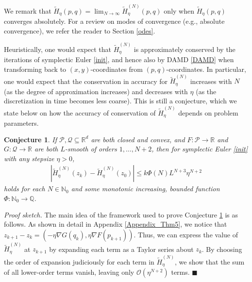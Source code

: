 \documentclass[11pt]{article}
\newtheorem{conjecture}{Conjecture}
\renewcommand{\P}{\mathcal{P}}
\newcommand{\R}{\mathbb{R}}
\newcommand{\N}{\mathbb{N}}
\newcommand{\Q}{\mathcal{Q}}
\begin{document}
We remark that $\widetilde{H}_{\eta}(p, q)=\lim_{N \to \infty} \widetilde{H}_{\eta}^{(N)}(p, q)$ only when $\widetilde{H}_{\eta}(p, q)$ converges absolutely. For a review on modes of convergence (e.g., absolute convergence), we refer the reader to Section \ref{odes}. 

Heuristically, one would expect that $\widetilde{H}_{\eta}^{(N)}$ is approximately conserved by the iterations of symplectic Euler \eqref{init}, and hence also by DAMD \eqref{DAMD} when transforming back to $(x,y)$-coordinates from $(p,q)$-coordinates. In particular, one would expect that the conservation in accuracy for $\widetilde{H}_{\eta}^{(N)}$ increases with $N$ (as the degree of approximation increases) and decreases with $\eta$ (as the discretization in time becomes less coarse). 
This is still a conjecture, which we state below on how the accuracy of conservation of $\widetilde{H}_{\eta}^{(N)}$ depends on problem parameters.

\begin{conjecture}\label{Conjecture_MH_General}
    If $\P,\Q\subseteq\R^{d}$ are both closed and convex, and $F:\P\rightarrow\R$ and $G:\Q\rightarrow\R$ are both $L$-smooth of orders $1,\dots,N+2$, then for symplectic Euler \eqref{init} with any stepsize $\eta>0$, 
    \begin{gather}
        |\widetilde{H}_{\eta}^{(N)}(z_{k})-\widetilde{H}_{\eta}^{(N)}(z_0)|\leq k\Phi\left(N\right)L^{N+3}\eta^{N+2}\label{conj}
    \end{gather}
    holds for each $N\in\N_{0}$ and some monotonic increasing, bounded function $\Phi:\N_{0}\rightarrow\mathbb{Q}$. 
\end{conjecture}

\noindent \textit{Proof sketch.} The main idea of the framework used to prove Conjecture \ref{Conjecture_MH_General} is as follows. As shown in detail in Appendix \ref{Appendix_Thm5}, we notice that $z_{k+1}-z_k = (-\eta \nabla G(q_k), \eta \nabla F(p_{k+1}))$. Thus, we can express the value of $\widetilde{H}_{\eta}^{(N)}$ at $z_{k+1}$ by expanding each term as a Taylor series about $z_k$. By choosing the order of expansion judiciously for each term in $\widetilde{H}_{\eta}^{(N)}$, we show that the sum of all lower-order terms vanish, leaving only $\mathcal{O}\left(\eta^{N+2}\right)$ terms.  \hfill$\blacksquare$

\medskip
\end{document}
